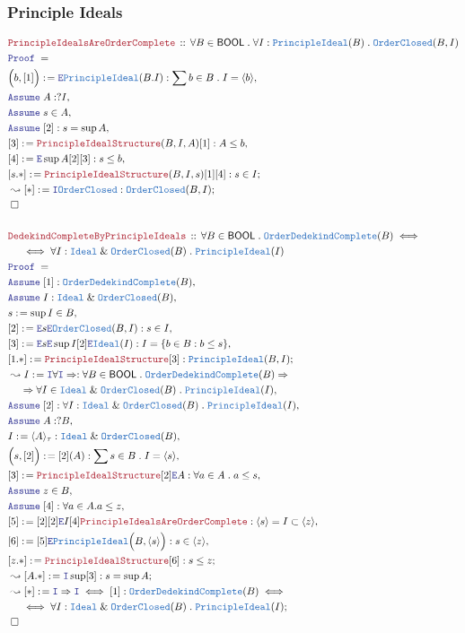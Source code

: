 \documentclass[12pt]{scrartcl}
\newcommand{\TYPE}[1]{\textcolor{NavyBlue}{\mathtt{#1}}}
\newcommand{\LOGIC}[1]{\textcolor{Blue}{\mathtt{#1}}}
\newcommand{\THM}[1]{\textcolor{Maroon}{\mathtt{#1}}}
\renewcommand{\.}{\; . \;}
\newcommand{\de}{: \kern 0.1pc =}
\newcommand{\Theorem}[2]{& \THM{#1} \, :: \, #2 \\ & \Proof = \\ }
\newcommand{\NewLine}{\\ & \kern 1pc}
\newcommand{\Page}[1]{ \begin{align*} #1 \end{align*}   }
\renewcommand{\And}{\; \& \;}
\newcommand{\Imply}{\Rightarrow}
\newcommand{\Intro}{\LOGIC{I}}
\newcommand{\Elim}{\LOGIC{E}}
\newcommand{\Say}[3]{& #1 \de #2 : #3, \\}
\newcommand{\SayIn}[3]{& #1 \de #2 \in #3, \\}
\newcommand{\Conclude}[3]{& #1 \de #2 : #3; \\}
\newcommand{\Derive}[3]{& \leadsto #1 \de #2 : #3, \\}
\newcommand{\DeriveConclude}[3]{& \leadsto #1 \de #2 : #3 ; \\}
\newcommand{\Assume}[2]{& \LOGIC{Assume} \; #1 : #2, \\}
\newcommand{\AssumeIn}[2]{& \LOGIC{Assume} \; #1 \in #2, \\}
\newcommand{\QED}{\; \square}
\newcommand{\EndProof}{& \QED \\}
\newcommand{\Proof}{\LOGIC{Proof} \; }
\newcommand{\Ideal}{\TYPE{Ideal}}
\newcommand{\Principle}{\TYPE{PrincipleIdeal}}
\newcommand{\OC}{\TYPE{OrderClosed}}
\newcommand{\OComplete}{\TYPE{OrderDedekindComplete}}
\newcommand{\BOOL}{\mathsf{BOOL}}
\begin{document}
\subsubsection{Principle Ideals}
\Page{
	\Theorem{PrincipleIdealsAreOrderComplete}
	{
		\forall B \in \BOOL \. 
		\forall I : \Principle(B) \.
		\OC(B,I) 
	}
	\Say{\Big( b,[1]\Big)}{\Elim \Principle(B.I)}
	{
		\sum b \in B \. I = \langle b \rangle
	}
	\Assume{A}{?I}
	\AssumeIn{s}{A}
	\Assume{[2]}{s = \sup A}
	\Say{[3]}{\THM{PrincipleIdealStructure}(B,I,A)[1]}{A \le b}
	\Say{[4]}{\Elim \sup A [2][3]}{ s \le b}
	\Conclude{[s.*]}{\THM{PrincipleIdealStructure}(B,I,s)[1][4]}{s \in I}
	\DeriveConclude{[*]}{\Intro \OC}{\OC(B,I)}
	\EndProof
	\\
	\Theorem{DedekindCompleteByPrincipleIdeals}
	{
		\forall B \in \BOOL \.
		\OComplete(B) 
		\iff
		\NewLine
		\iff
		\forall I : \Ideal \And \OC(B) \.
		\Principle(I)		
	}
	\Assume{[1]}{\OComplete(B)}
	\Assume{I}{\Ideal \And \OC(B)}
	\SayIn{s}{\sup I}{B}
	\Say{[2]}{\Elim s \Elim \OC(B,I)}{s \in I}
	\Say{[3]}{\Elim s \Elim \sup I [2] \Elim \Ideal(I)}{I = \{ b \in B : b \le s\}}
	\Conclude{[1.*]}{\THM{PrincipleIdealStructure}[3]}{\Principle(B,I)}
	\Derive{I}{\Intro \forall \Intro \Imply}
	{
		\forall B \in \BOOL \.
		\OComplete(B) 
		\Imply
		\NewLine
		\Imply
		\forall I \in \Ideal \And \OC(B) \.
		\Principle(I)
	}
	\Assume{[2]}
	{
		\forall I : \Ideal \And \OC(B) \.
		\Principle(I)
	}
	\Assume{A}{?B}
	\Say{I}{\langle A \rangle_\tau}{\Ideal \And \OC(B)}
	\Say{\Big(s,[2]\Big)}{[2](A)}{\sum s \in B \. I = \langle s \rangle}
	\Say{[3]}{\THM{PrincipleIdealStructure}[2]\Elim A}{ \forall a \in A \. a \le s}
	\AssumeIn{z}{B}
	\Assume{[4]}{\forall a \in A . a \le z  }
	\Say{[5]}{[2][2]\Elim I [4]\THM{PrincipleIdealsAreOrderComplete}}{   \langle s \rangle =    I   \subset \langle z \rangle}
	\Say{[6]}{[5]\Elim \Principle\Big(B,\langle s \rangle\Big) }{s \in \langle  z\rangle}
	\Conclude{[z.*]}{\THM{PrincipleIdealStructure}[6]}{s \le z}
	\DeriveConclude{[A.*]}{\Intro \sup [3]}{s = \sup A}
	\DeriveConclude{[*]}{\Intro \Imply \Intro \iff [1]}
	{
		\OComplete(B) 
		\iff
		\NewLine
		\iff
		\forall I : \Ideal \And \OC(B) \.
		\Principle(I)
	}
	\EndProof
}
\end{document}

